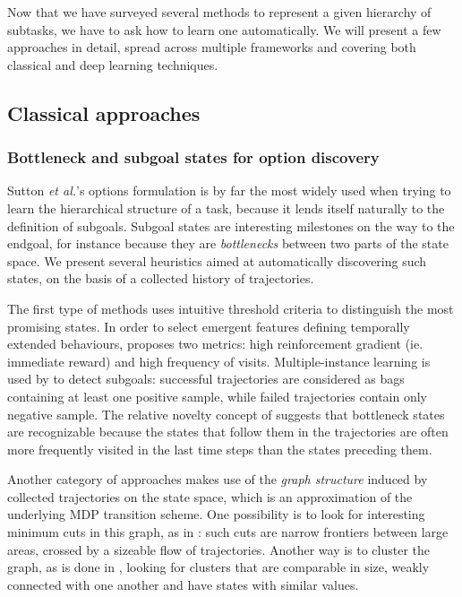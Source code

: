 \documentclass{article}
\newcommand{\etal}{\textit{et al.}}
\begin{document}
Now that we have surveyed several methods to represent a given hierarchy of subtasks, we have to ask how to learn one automatically. We will present a few approaches in detail, spread across multiple frameworks and covering both classical and deep learning techniques.

\subsection{Classical approaches}

\subsubsection{Bottleneck and subgoal states for option discovery}

Sutton \etal's options formulation \cite{sutton_between_1999} is by far the most widely used when trying to learn the hierarchical structure of a task, because it lends itself naturally to the definition of subgoals. Subgoal states are interesting milestones on the way to the endgoal, for instance because they are \textit{bottlenecks} between two parts of the state space. We present several heuristics aimed at automatically discovering such states, on the basis of a collected history of trajectories.

The first type of methods uses intuitive threshold criteria to distinguish the most promising states. In order to select emergent features defining temporally extended behaviours, \cite{digney_learning_1998} proposes two metrics: high reinforcement gradient (ie. immediate reward) and high frequency of visits. Multiple-instance learning is used by \cite{mcgovern_automatic_2001} to detect subgoals: successful trajectories are considered as bags containing at least one positive sample, while failed trajectories contain only negative sample. The relative novelty concept of \cite{simsek_using_2004} suggests that bottleneck states are recognizable because the states that follow them in the trajectories are often more frequently visited in the last time steps than the states preceding them.

Another category of approaches makes use of the \textit{graph structure} induced by collected trajectories on the state space, which is an approximation of the underlying MDP transition scheme. One possibility is to look for interesting minimum cuts in this graph, as in  \cite{goos_q-cutdynamic_2002}: such cuts are narrow frontiers between large areas, crossed by a sizeable flow of trajectories. Another way is to cluster the graph, as is done in \cite{mannor_dynamic_2004}, looking for clusters that are comparable in size, weakly connected with one another and have states with similar values.
\end{document}
